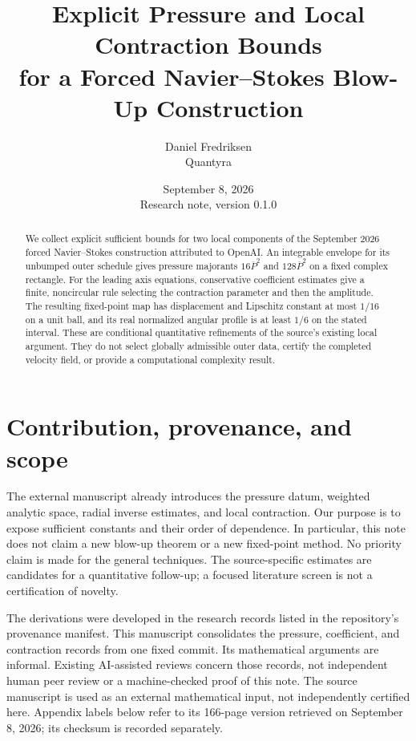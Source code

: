 \documentclass[11pt]{article}
\title{Explicit Pressure and Local Contraction Bounds\\for a Forced Navier--Stokes Blow-Up Construction}
\author{Daniel Fredriksen\\\small Quantyra}
\date{September 8, 2026\\\small Research note, version 0.1.0}
\begin{document}
\maketitle
\begin{abstract}
We collect explicit sufficient bounds for two local components of the
September 2026 forced Navier--Stokes construction attributed to OpenAI.
An integrable envelope for its unbumped outer schedule gives pressure
majorants $16\overline P^2$ and $128\overline P^2$ on a fixed complex rectangle.
For the leading axis equations, conservative coefficient estimates give a
finite, noncircular rule selecting the contraction parameter and then the
amplitude. The resulting fixed-point map has displacement and Lipschitz
constant at most $1/16$ on a unit ball, and its real normalized angular
profile is at least $1/6$ on the stated interval. These are conditional
quantitative refinements of the source's existing local argument. They do
not select globally admissible outer data, certify the completed velocity
field, or provide a computational complexity result.
\end{abstract}

\section{Contribution, provenance, and scope}
The external manuscript \cite{openai} already introduces the pressure datum,
weighted analytic space, radial inverse estimates, and local contraction.
Our purpose is to expose sufficient constants and their order of dependence.
In particular, this note does not claim a new blow-up theorem or a new
fixed-point method. No priority claim is made for the general techniques.
The source-specific estimates are candidates for a quantitative follow-up;
a focused literature screen is not a certification of novelty.

The derivations were developed in the research records listed in the
repository's provenance manifest. This manuscript consolidates the pressure,
coefficient, and contraction records from one fixed commit. Its mathematical
arguments are informal. Existing AI-assisted reviews concern those records,
not independent human peer review or a machine-checked proof of this note.
The source manuscript is used as an external mathematical input, not
independently certified here. Appendix labels below refer to its 166-page
version retrieved on September 8, 2026; its checksum is recorded separately.
\end{document}
